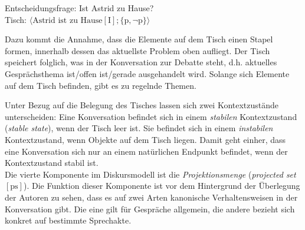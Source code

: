 \begin{exe}
	\ex\label{230} 
			Entscheidungsfrage: Ist Astrid zu Hause?\\
			Tisch: $\langle \textrm{Astrid ist zu Hause} [\textrm{I}];\lbrace \textrm{p},\neg \textrm{p}\rbrace\rangle$
\end{exe}
Dazu kommt die Annahme, dass die Elemente auf dem Tisch einen Stapel formen, innerhalb dessen das aktuellste \glq Problem\grq {} oben aufliegt. Der Tisch speichert folglich, was in der Konversation zur Debatte steht, d.h. aktuelles Gesprächsthema ist/offen ist/gerade ausgehandelt wird. Solange sich Elemente auf dem Tisch befinden, gibt es zu regelnde Themen.

Unter Bezug auf die Belegung des Tisches lassen sich zwei Kontextzustände unterscheiden: Eine Konversation befindet sich in einem \textit{stabilen} Kontextzustand  (\textit{stable state}), wenn der Tisch leer ist. Sie befindet sich in einem \textit{instabilen} Kontextzustand,  wenn Objekte auf dem Tisch liegen. Damit geht einher, dass eine Konversation sich nur an einem natürlichen Endpunkt befindet, wenn der Kontextzustand stabil ist.\\

\noindent
Die vierte Komponente im Diskursmodell ist die \textit{Projektionsmenge} (\textit{projected set}  $[\textrm{ps}]$). Die Funktion dieser Komponente ist vor dem Hintergrund der Überlegung der Autoren zu sehen, dass es auf zwei Arten kanonische Verhaltensweisen in der Konversation gibt. Die eine gilt für Gespräche allgemein, die andere bezieht sich konkret auf bestimmte Sprechakte. 


